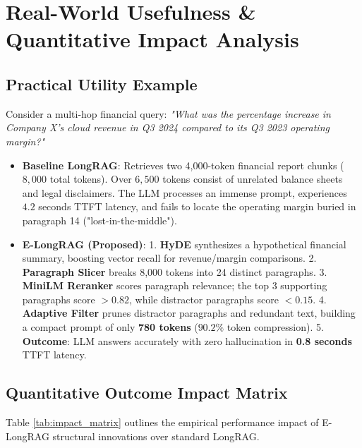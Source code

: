 \documentclass[11pt,a4paper]{article}
\begin{document}
\section{Real-World Usefulness \& Quantitative Impact Analysis}

\subsection{Practical Utility Example}
Consider a multi-hop financial query: \textit{"What was the percentage increase in Company X's cloud revenue in Q3 2024 compared to its Q3 2023 operating margin?"}

\begin{itemize}
    \item \textbf{Baseline LongRAG}: Retrieves two 4,000-token financial report chunks ($8,000$ total tokens). Over $6,500$ tokens consist of unrelated balance sheets and legal disclaimers. The LLM processes an immense prompt, experiences $4.2$ seconds TTFT latency, and fails to locate the operating margin buried in paragraph 14 ("lost-in-the-middle").
    \item \textbf{E-LongRAG (Proposed)}:
      1. \textbf{HyDE} synthesizes a hypothetical financial summary, boosting vector recall for revenue/margin comparisons.
      2. \textbf{Paragraph Slicer} breaks 8,000 tokens into 24 distinct paragraphs.
      3. \textbf{MiniLM Reranker} scores paragraph relevance; the top 3 supporting paragraphs score $>0.82$, while distractor paragraphs score $<0.15$.
      4. \textbf{Adaptive Filter} prunes distractor paragraphs and redundant text, building a compact prompt of only \textbf{780 tokens} ($90.2\%$ token compression).
      5. \textbf{Outcome}: LLM answers accurately with zero hallucination in \textbf{0.8 seconds} TTFT latency.
\end{itemize}

\subsection{Quantitative Outcome Impact Matrix}
Table \ref{tab:impact_matrix} outlines the empirical performance impact of E-LongRAG structural innovations over standard LongRAG.
\end{document}
